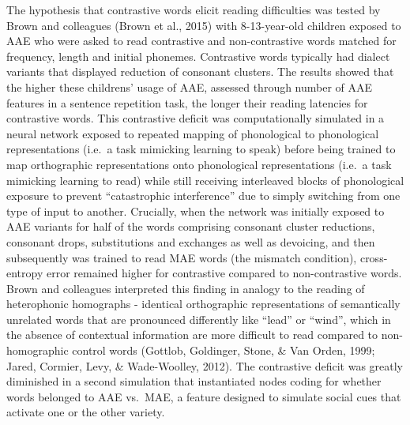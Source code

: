\documentclass[doc,floatsintext]{apa6}
\begin{document}
The hypothesis that contrastive words elicit reading difficulties was
tested by Brown and colleagues (Brown et al., 2015) with 8-13-year-old
children exposed to AAE who were asked to read contrastive and
non-contrastive words matched for frequency, length and initial
phonemes. Contrastive words typically had dialect variants that
displayed reduction of consonant clusters. The results showed that the
higher these childrens' usage of AAE, assessed through number of AAE
features in a sentence repetition task, the longer their reading
latencies for contrastive words. This contrastive deficit was
computationally simulated in a neural network exposed to repeated
mapping of phonological to phonological representations (i.e.~a task
mimicking learning to speak) before being trained to map orthographic
representations onto phonological representations (i.e.~a task mimicking
learning to read) while still receiving interleaved blocks of
phonological exposure to prevent \enquote{catastrophic interference} due
to simply switching from one type of input to another. Crucially, when
the network was initially exposed to AAE variants for half of the words
comprising consonant cluster reductions, consonant drops, substitutions
and exchanges as well as devoicing, and then subsequently was trained to
read MAE words (the mismatch condition), cross-entropy error remained
higher for contrastive compared to non-contrastive words. Brown and
colleagues interpreted this finding in analogy to the reading of
heterophonic homographs - identical orthographic representations of
semantically unrelated words that are pronounced differently like
\enquote{lead} or \enquote{wind}, which in the absence of contextual
information are more difficult to read compared to non-homographic
control words (Gottlob, Goldinger, Stone, \& Van Orden, 1999; Jared,
Cormier, Levy, \& Wade-Woolley, 2012). The contrastive deficit was
greatly diminished in a second simulation that instantiated nodes coding
for whether words belonged to AAE vs.~MAE, a feature designed to
simulate social cues that activate one or the other variety.
\end{document}
